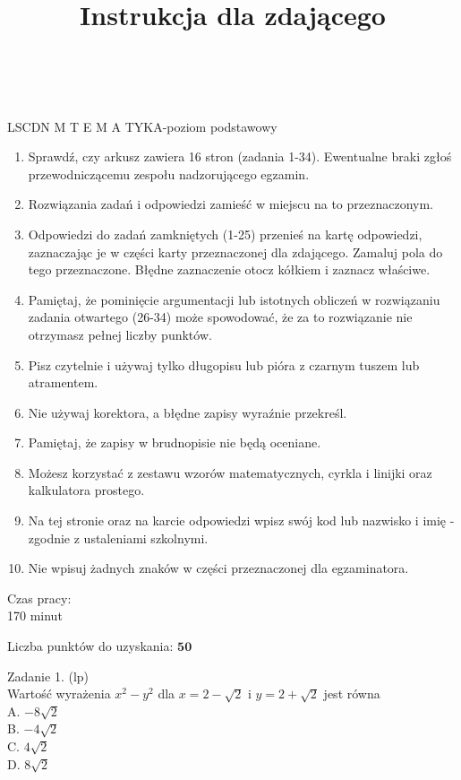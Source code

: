 \documentclass[10pt]{article}
\title{Instrukcja dla zdającego }
\author{}
\date{}
\begin{document}
\maketitle
\(\qquad\)\\
\(\qquad\)\\
LSCDN M T E M A TYKA-poziom podstawowy

\begin{enumerate}
  \item Sprawdź, czy arkusz zawiera 16 stron (zadania 1-34). Ewentualne braki zgłoś przewodniczącemu zespołu nadzorującego egzamin.
  \item Rozwiązania zadań i odpowiedzi zamieść w miejscu na to przeznaczonym.
  \item Odpowiedzi do zadań zamkniętych (1-25) przenieś na kartę odpowiedzi, zaznaczając je w części karty przeznaczonej dla zdającego. Zamaluj pola do tego przeznaczone. Błędne zaznaczenie otocz kółkiem i zaznacz właściwe.
  \item Pamiętaj, że pominięcie argumentacji lub istotnych obliczeń w rozwiązaniu zadania otwartego (26-34) może spowodować, że za to rozwiązanie nie otrzymasz pełnej liczby punktów.
  \item Pisz czytelnie i używaj tylko długopisu lub pióra z czarnym tuszem lub atramentem.
  \item Nie używaj korektora, a błędne zapisy wyraźnie przekreśl.
  \item Pamiętaj, że zapisy w brudnopisie nie będą oceniane.
  \item Możesz korzystać z zestawu wzorów matematycznych, cyrkla i linijki oraz kalkulatora prostego.
  \item Na tej stronie oraz na karcie odpowiedzi wpisz swój kod lub nazwisko i imię - zgodnie z ustaleniami szkolnymi.
  \item Nie wpisuj żadnych znaków w części przeznaczonej dla egzaminatora.
\end{enumerate}

Czas pracy:\\
170 minut

Liczba punktów do uzyskania: \(\mathbf{5 0}\)

Zadanie 1. (lp)\\
Wartość wyrażenia \(x^{2}-y^{2}\) dla \(x=2-\sqrt{2}\) i \(y=2+\sqrt{2}\) jest równa\\
A. \(-8 \sqrt{2}\)\\
B. \(-4 \sqrt{2}\)\\
C. \(4 \sqrt{2}\)\\
D. \(8 \sqrt{2}\)
\end{document}
